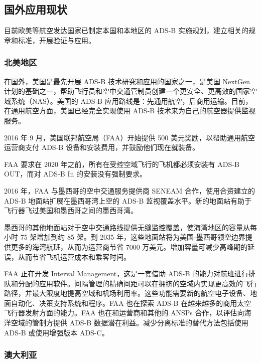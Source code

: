 
\subsection{国外应用现状}

目前欧美等航空发达国家已制定本国和本地区的 ADS-B 实施规划，建立相关的规章和标准，开展验证与应用。

\subsubsection{北美地区}

在国外，美国是最先开展 ADS-B 技术研究和应用的国家之一，是美国 NextGen 计划的基础之一，帮助飞行员和空中交通管制员创建一个更安全、更高效的国家空域系统（NAS）。美国的 ADS-B 应用路线是：先通用航空，后商用运输。目前，在通用航空方面，美国已经完全实现使用 ADS-B 技术来为自己的航空器提供监视服务。

2016 年 9 月，美国联邦航空局（FAA）开始提供 500 美元奖励，以帮助通用航空运营商支付 ADS-B 设备和安装费用，并鼓励他们现在就装备。

FAA 要求在 2020 年之前，所有在受控空域飞行的飞机都必须安装有 ADS-B OUT，而对 ADS-B In 的安装没有强制要求。

2016 年，FAA 与墨西哥的空中交通服务提供商 SENEAM 合作，使用合资建立的 ADS-B 地面站扩展在墨西哥湾上空的 ADS-B 监视覆盖水平。新的地面站有助于飞行器飞过美国和墨西哥之间的墨西哥湾。

墨西哥的其他地面站对于空中交通路线提供无缝监控覆盖，使海湾地区的容量从每小时 75 架增加到约 85 架。到 2035 年，这些地面站将为美国-墨西哥领空边界提供更多的海湾航班，从而为运营商节省 7000 万美元。增加容量可减少高峰期的延误，从而节省飞机运营成本和乘客时间。

FAA 正在开发 Interval Management，这是一套借助 ADS-B 的能力对航班进行排队和分配的应用软件。间隔管理的精确间距可以在拥挤的空域内实现更高效的飞行路径，并最大限度地提高空域和机场利用率。这些功能需要新的航空电子设备、地面自动化、决策支持系统和程序。FAA 也在探索 ADS-B 在越来越多的商用太空飞行器发射方面的能力。FAA 也在和运营商和其他的 ANSPs 合作，以评估向海洋空域的管制方提供 ADS-B 数据潜在利益。减少分离标准的替代方法包括使用 ADS-B 或使用增强版本 ADS-C。

\subsubsection{澳大利亚}

